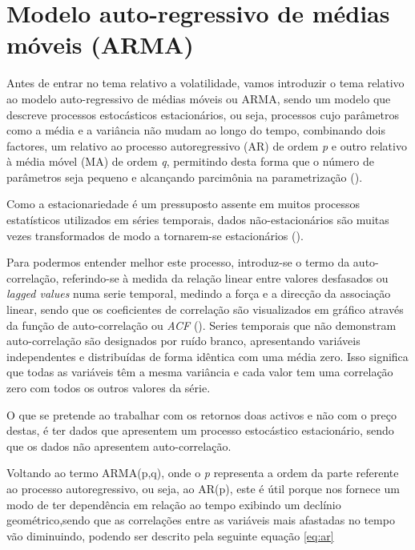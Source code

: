 \documentclass[
  12pt,
  a4paper,
  openany]{book}
\theoremstyle{definition}
\theoremstyle{definition}
\theoremstyle{definition}
\theoremstyle{remark}
\begin{document}
\hypertarget{modelo-auto-regressivo-de-muxe9dias-muxf3veis-arma}{%
\section{Modelo auto-regressivo de médias móveis (ARMA)}\label{modelo-auto-regressivo-de-muxe9dias-muxf3veis-arma}}

Antes de entrar no tema relativo a volatilidade, vamos introduzir o tema relativo ao modelo auto-regressivo de médias móveis ou ARMA, sendo um modelo que descreve processos estocásticos estacionários, ou seja, processos cujo parâmetros como a média e a variância não mudam ao longo do tempo, combinando dois factores, um relativo ao processo autoregressivo (AR) de ordem \emph{p} e outro relativo à média móvel (MA) de ordem \emph{q}, permitindo desta forma que o número de parâmetros seja pequeno e alcançando parcimônia na parametrização (\citet{parcimonia}).

Como a estacionariedade é um pressuposto assente em muitos processos estatísticos utilizados em séries temporais, dados não-estacionários são muitas vezes transformados de modo a tornarem-se estacionários (\citet{station}).

Para podermos entender melhor este processo, introduz-se o termo da auto-correlação, referindo-se à medida da relação linear entre valores desfasados ou \emph{lagged values} numa serie temporal, medindo a força e a direcção da associação linear, sendo que os coeficientes de correlação são visualizados em gráfico através da função de auto-correlação ou \emph{ACF} (\citet{foregeorge}). Series temporais que não demonstram auto-correlação são designados por ruído branco, apresentando variáveis independentes e distribuídas de forma idêntica com uma média zero. Isso significa que todas as variáveis têm a mesma variância e cada valor tem uma correlação zero com todos os outros valores da série.

O que se pretende ao trabalhar com os retornos doas activos e não com o preço destas, é ter dados que apresentem um processo estocástico estacionário, sendo que os dados não apresentem auto-correlação.

Voltando ao termo ARMA(p,q), onde o \emph{p} representa a ordem da parte referente ao processo autoregressivo, ou seja, ao AR(p), este é útil porque nos fornece um modo de ter dependência em relação ao tempo exibindo um declínio geométrico,sendo que as correlações entre as variáveis mais afastadas no tempo vão diminuindo, podendo ser descrito pela seguinte equação \eqref{eq:ar}
\end{document}
